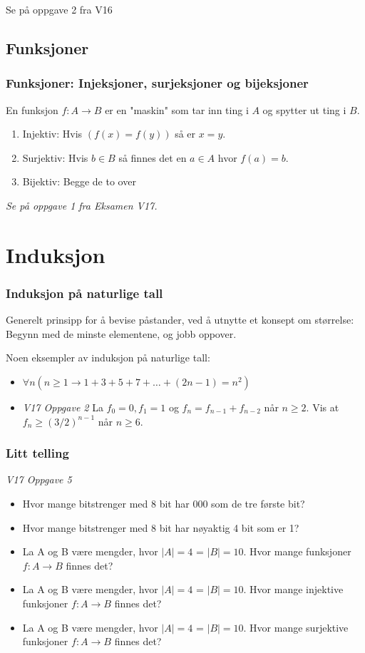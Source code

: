 \documentclass{beamer}
\begin{document}
\begin{frame}
Se på oppgave 2 fra V16
\end{frame}

\subsection{Funksjoner}
\begin{frame}
	\frametitle{Funksjoner: Injeksjoner, surjeksjoner og bijeksjoner}
	En funksjon $f:A \rightarrow B$ er en "maskin" som tar inn ting i $A$ og spytter ut ting i $B$.
	
	\begin{enumerate}
		\item Injektiv: Hvis $(f(x) = f(y))$ så er $x = y$.
		\item Surjektiv: Hvis $b \in B$ så finnes det en $a \in A$ hvor $f(a) = b$.
		\item Bijektiv: Begge de to over
	\end{enumerate}

\textit{Se på oppgave 1 fra Eksamen V17.}
\end{frame}


\section{Induksjon}


\begin{frame}
\frametitle{Induksjon på naturlige tall}
Generelt prinsipp for å bevise påstander, ved å utnytte et konsept om størrelse: Begynn med de minste elementene, og jobb oppover. \linebreak

Noen eksempler av induksjon på naturlige tall:
\begin{itemize}
	\item $\forall n (n \geq 1 \rightarrow 1 + 3 + 5 + 7 +\dots + (2n-1) = n^2)$
	
	\item \textit{V17 Oppgave 2} La $f_0 = 0, f_1 = 1$ og $f_n = f_{n-1} + f_{n-2}$ når $n \geq 2$. Vis at $f_n \geq (3/2)^{n-1}$ når $n \geq 6$.
\end{itemize}

\end{frame}

\begin{frame}
	\frametitle{Litt telling}
	\textit{V17 Oppgave 5}
	\begin{itemize}
		\item Hvor mange bitstrenger med 8 bit har 000 som de tre første bit?
		\item Hvor mange bitstrenger med 8 bit har nøyaktig 4 bit som er 1?
		\item La A og B være mengder, hvor $|A| = 4$ = $|B| = 10$. Hvor mange funksjoner $f:A \rightarrow B$ finnes det?
		\item La A og B være mengder, hvor $|A| = 4$ = $|B| = 10$. Hvor mange injektive funksjoner $f:A \rightarrow B$ finnes det?
		\item La A og B være mengder, hvor $|A| = 4$ = $|B| = 10$. Hvor mange surjektive funksjoner $f:A \rightarrow B$ finnes det?
	\end{itemize}
\end{frame}
\end{document}
